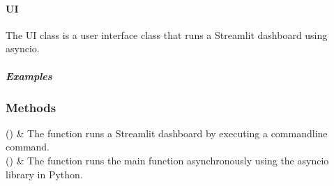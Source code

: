 \documentclass[letterpaper,10pt,english,openany,oneside]{sphinxmanual}
\begin{document}
\sphinxstepscope


\paragraph{UI}
\label{\detokenize{api_reference/generated/QuadratiK.ui.UI:ui}}\label{\detokenize{api_reference/generated/QuadratiK.ui.UI::doc}}

\begin{fulllineitems}
\label{\detokenize{api_reference/generated/QuadratiK.ui.UI:QuadratiK.ui.UI}}
\pysigstartsignatures
{}
\pysigstopsignatures
\sphinxAtStartPar
The UI class is a user interface class that runs a Streamlit dashboard using asyncio.


\subparagraph{Examples}
\label{\detokenize{api_reference/generated/QuadratiK.ui.UI:examples}}
\begin{sphinxVerbatim}[commandchars=\\\{\}]
   
\end{sphinxVerbatim}

\end{fulllineitems}

\subsubsection*{Methods}


\begin{savenotes}\sphinxattablestart
\sphinxthistablewithglobalstyle
\sphinxthistablewithnovlinesstyle
\centering
\begin{tabulary}{\linewidth}[t]{}
\sphinxtoprule
\sphinxtableatstartofbodyhook
\sphinxAtStartPar
{\hyperref[\detokenize{api_reference/generated/QuadratiK.ui.UI:QuadratiK.ui.UI.main}]{}}()
&
\sphinxAtStartPar
The  function runs a Streamlit dashboard by executing a command\sphinxhyphen{}line command.
\\
\sphinxhline
\sphinxAtStartPar
{\hyperref[\detokenize{api_reference/generated/QuadratiK.ui.UI:QuadratiK.ui.UI.run}]{}}()
&
\sphinxAtStartPar
The function runs the main function asynchronously using the asyncio library in Python.
\\
\sphinxbottomrule
\end{tabulary}
\sphinxtableafterendhook\par
\sphinxattableend\end{savenotes}
\end{document}
